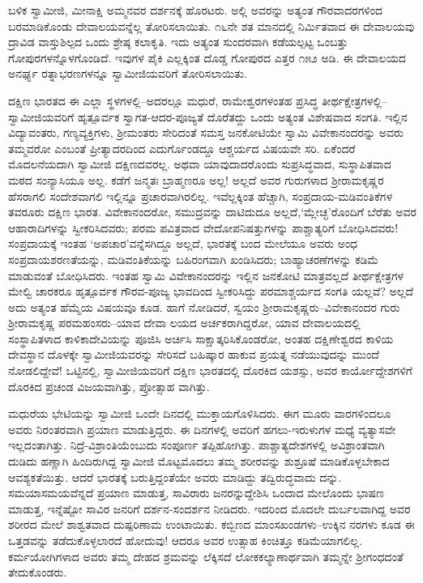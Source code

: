 ಬಳಿಕ ಸ್ವಾಮೀಜಿ, ಮೀನಾಕ್ಷಿ ಅಮ್ಮನವರ ದರ್ಶನಕ್ಕೆ ಹೊರಟರು. ಅಲ್ಲಿ ಅವರನ್ನು ಅತ್ಯಂತ ಗೌರವಾದರಗಳಿಂದ ಬರಮಾಡಿಕೊಂಡು ದೇವಾಲಯವನ್ನೆಲ್ಲ ತೋರಿಸಲಾಯಿತು. ೧೬ನೇ ಶತ ಮಾನದಲ್ಲಿ ನಿರ್ಮಿತವಾದ ಈ ದೇವಾಲಯವು ದ್ರಾವಿಡ ವಾಸ್ತುಶಿಲ್ಪದ ಒಂದು ಶ್ರೇಷ್ಠ ಕಲಾಕೃತಿ. ಇದು ಅತ್ಯಂತ ಸುಂದರವಾಗಿ ಕಡೆಯಲ್ಪಟ್ಟ ಒಂಬತ್ತು ಗೋಪುರಗಳನ್ನೊಳಗೊಂಡಿದೆ. ಇವುಗಳ ಪೈಕಿ ಎಲ್ಲಕ್ಕಿಂತ ದೊಡ್ಡ ಗೋಪುರದ ಎತ್ತರ ೧೫೨ ಅಡಿ. ಈ ದೇವಾಲಯದ ಅನರ್ಘ್ಯ ರತ್ನಾಭರಣಗಳನ್ನೂ ಸ್ವಾಮೀಜಿಯವರಿಗೆ ತೋರಿಸಲಾಯಿತು.

ದಕ್ಷಿಣ ಭಾರತದ ಈ ಎಲ್ಲಾ ಸ್ಥಳಗಳಲ್ಲಿ–ಅದರಲ್ಲೂ ಮಧುರೆ, ರಾಮೇಶ್ವರಗಳಂತಹ ಪ್ರಸಿದ್ಧ ತೀರ್ಥಕ್ಷೇತ್ರಗಳಲ್ಲಿ–ಸ್ವಾಮೀಜಿಯವರಿಗೆ ಹೃತ್ಪೂರ್ವಕ ಸ್ವಾಗತ-ಆದರ-ಪೂಜ್ಯತೆ ದೊರೆತದ್ದು ಒಂದು ಅತ್ಯಂತ ವಿಶೇಷವಾದ ಸಂಗತಿ. ಇಲ್ಲಿನ ವಿದ್ಯಾವಂತರು, ಗಣ್ಯವ್ಯಕ್ತಿಗಳು, ಶ್ರೀಮಂತರು ಸೇರಿದಂತೆ ಸಮಸ್ತ ಜನಕೋಟಿಯೇ ಸ್ವಾಮಿ ವಿವೇಕಾನಂದರನ್ನು ಅವರು ತಮ್ಮವರೋ ಎಂಬಂತೆ ಪ್ರೀತ್ಯಾದರದಿಂದ ಎದುರ್ಗೊಂಡದ್ದೂ ಆಶ್ಚರ್ಯದ ವಿಷಯವೇ ಸರಿ. ಏಕೆಂದರೆ ಮೊದಲನೆಯದಾಗಿ ಸ್ವಾಮೀಜಿ ದಕ್ಷಿಣದವರಲ್ಲ. ಅಥವಾ ಯಾವುದಾದರೊಂದು ಸುಪ್ರಸಿದ್ಧವಾದ, ಸುಸ್ಥಾಪಿತವಾದ ಮಠದ ಸಂನ್ಯಾಸಿಯೂ ಅಲ್ಲ. ಕಡೆಗೆ ಜನ್ಮತಃ ಬ್ರಾಹ್ಮಣರೂ ಅಲ್ಲ! ಅಲ್ಲದೆ ಅವರ ಗುರುಗಳಾದ ಶ್ರೀರಾಮಕೃಷ್ಣರ ಹೆಸರಾಗಲಿ ಸಂದೇಶವಾಗಲಿ ಇಲ್ಲಿನ್ನೂ ಪ್ರಚಾರವಾಗಿರಲಿಲ್ಲ. ಇವೆಲ್ಲಕ್ಕಿಂತ ಹೆಚ್ಚಾಗಿ, ಸಂಪ್ರದಾಯ-ಮಡಿವಂತಿಕೆಗಳ ತವರೂರು ದಕ್ಷಿಣ ಭಾರತ. ವಿವೇಕಾನಂದರೋ, ಸಮುದ್ರವನ್ನು ದಾಟಿದುದೂ ಅಲ್ಲದೆ,‘ಮ್ಲೇಚ್ಛ’ರೊಂದಿಗೆ ಬೆರೆತು ಅವರ ಆಹಾರಾದಿಗಳನ್ನು ಸ್ವೀಕರಿಸಿದವರು; ಪರಮ ಪವಿತ್ರವಾದ ವೇದೋಪನಿಷತ್ತುಗಳನ್ನು ಪಾಶ್ಚಾತ್ಯರಿಗೆ ಬೋಧಿಸಿದವರು! ಸಂಪ್ರದಾಯಕ್ಕೆ ಇಂತಹ ‘ಅಪಚಾರ’ವನ್ನೆಸಗಿದ್ದೂ ಅಲ್ಲದೆ, ಭಾರತಕ್ಕೆ ಬಂದ ಮೇಲೆಯೂ ಅವರು ಅಂಧ ಸಂಪ್ರದಾಯಶರಣತೆಯನ್ನು, ಮಡಿವಂತಿಕೆಯನ್ನು ಬಹಿರಂಗವಾಗಿ ಖಂಡಿಸಿದರು; ಬಾಹ್ಯಾಚರಣೆಗಳನ್ನು ಕಡಿಮೆ ಮಾಡುವಂತೆ ಬೋಧಿಸಿದರು. ಇಂತಹ ಸ್ವಾಮಿ ವಿವೇಕಾನಂದರನ್ನು ಇಲ್ಲಿನ ಜನಕೋಟಿ ಮಾತ್ರವಲ್ಲದೆ ತೀರ್ಥಕ್ಷೇತ್ರಗಳ ಮೇಲ್ವಿ ಚಾರಕರೂ ಹೃತ್ಪೂರ್ವಕ ಗೌರವ-ಪೂಜ್ಯ ಭಾವದಿಂದ ಸ್ವೀಕರಿಸಿದ್ದು ಪರಮಾಶ್ಚರ್ಯದ ಸಂಗತಿ ಯಲ್ಲವೆ? ಅಲ್ಲದೆ ಅದು ಅತ್ಯಂತ ಹೆಮ್ಮೆಯ ವಿಷಯವೂ ಕೂಡ. ಹಾಗೆ ನೋಡಿದರೆ, ಸ್ವಯಂ ಶ್ರೀರಾಮಕೃಷ್ಣರು–ವಿವೇಕಾನಂದರ ಗುರು ಶ್ರೀರಾಮಕೃಷ್ಣ ಪರಮಹಂಸರು–ಯಾವ ದೇವಾ ಲಯದ ಅರ್ಚಕರಾಗಿದ್ದರೋ, ಯಾವ ದೇವಾಲಯದಲ್ಲಿ ಸಂಸ್ಥಾಪಿತಳಾದ ಕಾಳಿಕಾದೇವಿಯನ್ನು ಪೂಜಿಸಿ ಅರ್ಚಿಸಿ ಸಾಕ್ಷಾತ್ಕರಿಸಿಕೊಂಡರೋ, ಅಂತಹ ದಕ್ಷಿಣೇಶ್ವರದ ಕಾಳಿಯ ದೇವಸ್ಥಾನ ದೊಳಕ್ಕೇ ಸ್ವಾಮೀಜಿಯವರನ್ನು ಸೇರಿಸದೆ ಬಹಿಷ್ಕಾರ ಹಾಕುವ ಪ್ರಯತ್ನ ನಡೆಯುವುದನ್ನು ಮುಂದೆ ನೋಡಲಿದ್ದೇವೆ! ಒಟ್ಟಿನಲ್ಲಿ, ಸ್ವಾಮೀಜಿಯವರಿಗೆ ದಕ್ಷಿಣ ಭಾರತದಲ್ಲಿ ದೊರಕಿದ ಯಶಸ್ಸು, ಅವರ ಕಾರ್ಯೋದ್ದೇಶಗಳಿಗೆ ದೊರಕಿದ ಪ್ರಚಂಡ ವಿಜಯವಾಗಿತ್ತು, ಪ್ರೋತ್ಸಾಹ ವಾಗಿತ್ತು.

ಮಧುರೆಯ ಭೇಟಿಯನ್ನು ಸ್ವಾಮೀಜಿ ಒಂದೇ ದಿನದಲ್ಲಿ ಮುಕ್ತಾಯಗೊಳಿಸಿದರು. ಈಗ ಮೂರು ವಾರಗಳಿಂದಲೂ ಅವರು ನಿರಂತರವಾಗಿ ಪ್ರಯಾಣ ಮಾಡುತ್ತಿದ್ದರು. ಈ ದಿನಗಳಲ್ಲಿ ಅವರಿಗೆ ಹಗಲು-ಇರುಳುಗಳ ಮಧ್ಯೆ ವ್ಯತ್ಯಾಸವೇ ಇಲ್ಲದಂತಾಗಿತ್ತು. ನಿದ್ರೆ-ವಿಶ್ರಾಂತಿಯೆಂಬುದು ಸಂಪೂರ್ಣ ತಪ್ಪಿಹೋಗಿತ್ತು. ಪಾಶ್ಚಾತ್ಯದೇಶಗಳಲ್ಲಿ ಅವಿಶ್ರಾಂತವಾಗಿ ದುಡಿದು ಹಣ್ಣಾಗಿ ಹಿಂದಿರುಗಿದ್ದ ಸ್ವಾಮೀಜಿ ಮೊಟ್ಟಮೊದಲು ತಮ್ಮ ಶರೀರವನ್ನು ಶುಶ್ರೂಷೆ ಮಾಡಿಕೊಳ್ಳಬೇಕಾದ ಆವಶ್ಯಕತೆಯಿತ್ತು. ಆದರೆ ಭಾರತಕ್ಕೆ ಬರುತ್ತಿದ್ದಂತೆಯೇ ಅವರು ಮಾಡಿದ್ದು ತದ್ವಿರುದ್ಧವಾದು ದನ್ನು. ಸಮಯಾಸಮಯವೆನ್ನದೆ ಪ್ರಯಾಣ ಮಾಡುತ್ತ, ಸಾವಿರಾರು ಜನರನ್ನುದ್ದೇಶಿಸಿ ಒಂದಾದ ಮೇಲೊಂದು ಭಾಷಣ ಮಾಡುತ್ತ, ಇನ್ನೆಷ್ಟೋ ಸಾವಿರ ಜನರಿಗೆ ದರ್ಶನ-ಸಂದರ್ಶನ ನೀಡಿದರು. ಇದರಿಂದ ಮೊದಲೇ ದುರ್ಬಲವಾಗಿದ್ದ ಅವರ ಶರೀರದ ಮೇಲೆ ಶಾಶ್ವತವಾದ ದುಷ್ಪರಿಣಾಮ ಉಂಟಾಯಿತು. ಕಬ್ಬಿಣದ ಮಾಂಸಖಂಡಗಳು–ಉಕ್ಕಿನ ನರಗಳು ಕೂಡ ಈ ಒತ್ತಡವನ್ನು ತಡೆದುಕೊಳ್ಳಲಾರದೆ ಹೋದುವು! ಆದರೂ ಅವರ ಉತ್ಸಾಹ ಕಿಂಚಿತ್ತೂ ಕಡಿಮೆಯಾಗಲಿಲ್ಲ. ಕರ್ಮಯೋಗಿಗಳಾದ ಅವರು ತಮ್ಮ ದೇಹದ ಶ್ರಮವನ್ನು ಲೆಕ್ಕಿಸದೆ ಲೋಕಕಲ್ಯಾಣಾರ್ಥವಾಗಿ ತಮ್ಮನ್ನೇ ಶ್ರೀಗಂಧದಂತೆ ತೇದುಕೊಂಡರು.

